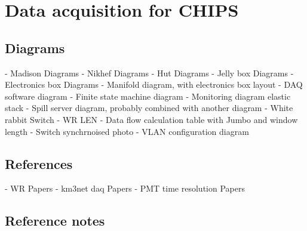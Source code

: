 \chapter{Data acquisition for CHIPS}
\label{chap:daq}




\section{Diagrams}

- Madison Diagrams
- Nikhef Diagrams
- Hut Diagrams
- Jelly box Diagrams
- Electronics box Diagrams
- Manifold diagram, with electronics box layout
- DAQ software diagram
- Finite state machine diagram
- Monitoring diagram elastic stack
- Spill server diagram, probably combined with another diagram
- White rabbit Switch
- WR LEN
- Data flow calculation table with Jumbo and window length
- Switch synchrnoised photo
- VLAN configuration diagram

\section{References}

- WR Papers
- km3net daq Papers
- PMT time resolution Papers

\section{Reference notes}